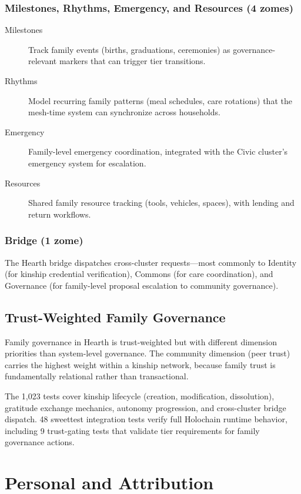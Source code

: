 \documentclass[12pt]{book}
\begin{document}
\subsection{Milestones, Rhythms, Emergency, and Resources (4 zomes)}

\begin{description}
  \item[Milestones] Track family events (births, graduations, ceremonies) as
    governance-relevant markers that can trigger tier transitions.
  \item[Rhythms] Model recurring family patterns (meal schedules, care
    rotations) that the mesh-time system can synchronize across households.
  \item[Emergency] Family-level emergency coordination, integrated with the
    Civic cluster's emergency system for escalation.
  \item[Resources] Shared family resource tracking (tools, vehicles, spaces),
    with lending and return workflows.
\end{description}

\subsection{Bridge (1 zome)}

The Hearth bridge dispatches cross-cluster requests---most commonly to
Identity (for kinship credential verification), Commons (for care coordination),
and Governance (for family-level proposal escalation to community governance).

\section{Trust-Weighted Family Governance}

Family governance in Hearth is trust-weighted but with different dimension
priorities than system-level governance. The community dimension (peer trust)
carries the highest weight within a kinship network, because family trust is
fundamentally relational rather than transactional.

The 1,023 tests cover kinship lifecycle (creation, modification, dissolution),
gratitude exchange mechanics, autonomy progression, and cross-cluster bridge
dispatch. 48 sweettest integration tests verify full Holochain runtime behavior,
including 9 trust-gating tests that validate tier requirements for
family governance actions.


\chapter{Personal and Attribution}
\end{document}
